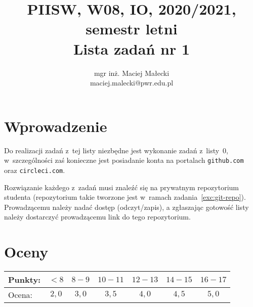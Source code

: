 \documentclass[12pt]{article}
\title{PIISW, W08, IO, 2020/2021, semestr letni\\Lista zadań nr 1}
\author{mgr inż. Maciej Małecki\\ \small maciej.malecki@pwr.edu.pl}
\begin{document}
    \maketitle

    \section*{Wprowadzenie}
        Do realizacji zadań z~tej listy niezbędne jest wykonanie zadań z~listy~0, w~szczególności zaś konieczne jest posiadanie konta na portalach \texttt{github.com} oraz \texttt{circleci.com}.

        Rozwiązanie każdego z~zadań musi znaleźć się na prywatnym repozytorium studenta (repozytorium takie tworzone jest w~ramach zadania~\ref{exc:git-repo}). Prowadzącemu należy nadać dostęp (odczyt/zapis), a zgłaszając gotowość listy należy dostarczyć prowadzącemu link do tego repozytorium.

    \section*{Oceny}
    \begin{tabular}{|l|c|c|c|c|c|c|}
        \hline
        Punkty: & $<8$ & $8-9$ & $10-11$ & $12-13$ & $14-15$ & $16-17$\\
        \hline
        Ocena:  & $2,0$ & $3,0$ & $3,5$ & $4,0$ & $4,5$ & $5,0$\\
        \hline
    \end{tabular}
\end{document}
